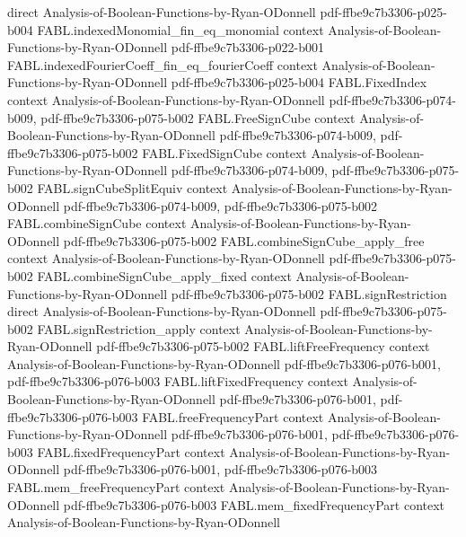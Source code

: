 \begin{theorem}
  {direct}
  {Analysis-of-Boolean-Functions-by-Ryan-ODonnell}
  {pdf-ffbe9c7b3306-p025-b004}
\proofstep
  {FABL.indexedMonomial_fin_eq_monomial}
  {context}
  {Analysis-of-Boolean-Functions-by-Ryan-ODonnell}
  {pdf-ffbe9c7b3306-p022-b001}
\proofstep
  {FABL.indexedFourierCoeff_fin_eq_fourierCoeff}
  {context}
  {Analysis-of-Boolean-Functions-by-Ryan-ODonnell}
  {pdf-ffbe9c7b3306-p025-b004}
\proofstep
  {FABL.FixedIndex}
  {context}
  {Analysis-of-Boolean-Functions-by-Ryan-ODonnell}
  {pdf-ffbe9c7b3306-p074-b009,
    pdf-ffbe9c7b3306-p075-b002}
\proofstep
  {FABL.FreeSignCube}
  {context}
  {Analysis-of-Boolean-Functions-by-Ryan-ODonnell}
  {pdf-ffbe9c7b3306-p074-b009,
    pdf-ffbe9c7b3306-p075-b002}
\proofstep
  {FABL.FixedSignCube}
  {context}
  {Analysis-of-Boolean-Functions-by-Ryan-ODonnell}
  {pdf-ffbe9c7b3306-p074-b009,
    pdf-ffbe9c7b3306-p075-b002}
\proofstep
  {FABL.signCubeSplitEquiv}
  {context}
  {Analysis-of-Boolean-Functions-by-Ryan-ODonnell}
  {pdf-ffbe9c7b3306-p074-b009,
    pdf-ffbe9c7b3306-p075-b002}
\proofstep
  {FABL.combineSignCube}
  {context}
  {Analysis-of-Boolean-Functions-by-Ryan-ODonnell}
  {pdf-ffbe9c7b3306-p075-b002}
\proofstep
  {FABL.combineSignCube_apply_free}
  {context}
  {Analysis-of-Boolean-Functions-by-Ryan-ODonnell}
  {pdf-ffbe9c7b3306-p075-b002}
\proofstep
  {FABL.combineSignCube_apply_fixed}
  {context}
  {Analysis-of-Boolean-Functions-by-Ryan-ODonnell}
  {pdf-ffbe9c7b3306-p075-b002}
\proofstep
  {FABL.signRestriction}
  {direct}
  {Analysis-of-Boolean-Functions-by-Ryan-ODonnell}
  {pdf-ffbe9c7b3306-p075-b002}
\proofstep
  {FABL.signRestriction_apply}
  {context}
  {Analysis-of-Boolean-Functions-by-Ryan-ODonnell}
  {pdf-ffbe9c7b3306-p075-b002}
\proofstep
  {FABL.liftFreeFrequency}
  {context}
  {Analysis-of-Boolean-Functions-by-Ryan-ODonnell}
  {pdf-ffbe9c7b3306-p076-b001,
    pdf-ffbe9c7b3306-p076-b003}
\proofstep
  {FABL.liftFixedFrequency}
  {context}
  {Analysis-of-Boolean-Functions-by-Ryan-ODonnell}
  {pdf-ffbe9c7b3306-p076-b001,
    pdf-ffbe9c7b3306-p076-b003}
\proofstep
  {FABL.freeFrequencyPart}
  {context}
  {Analysis-of-Boolean-Functions-by-Ryan-ODonnell}
  {pdf-ffbe9c7b3306-p076-b001,
    pdf-ffbe9c7b3306-p076-b003}
\proofstep
  {FABL.fixedFrequencyPart}
  {context}
  {Analysis-of-Boolean-Functions-by-Ryan-ODonnell}
  {pdf-ffbe9c7b3306-p076-b001,
    pdf-ffbe9c7b3306-p076-b003}
\proofstep
  {FABL.mem_freeFrequencyPart}
  {context}
  {Analysis-of-Boolean-Functions-by-Ryan-ODonnell}
  {pdf-ffbe9c7b3306-p076-b003}
\proofstep
  {FABL.mem_fixedFrequencyPart}
  {context}
  {Analysis-of-Boolean-Functions-by-Ryan-ODonnell}

\end{theorem}
